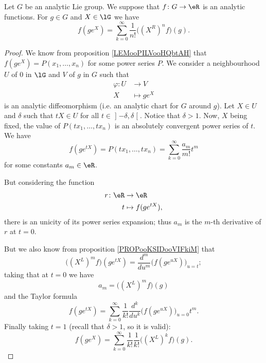 \begin{proposition}     \label{PROPooIYWQooZJtKiu}
	Let \( G\) be an analytic Lie group. We suppose that \( f\colon G\to \eR\) is an analytic functions. For \( g\in G\) and \( X\in \lG\) we have
	\begin{equation}
		f(g e^{X})=\sum_{k=0}^{\infty}\frac{1}{ n! }\big( (X^R)^nf \big)(g).
	\end{equation}
\end{proposition}

\begin{proof}
	We know from proposition \ref{LEMooPILVooHQbtAH} that \( f(g e^{X})=P(x_1,\ldots, x_n)\) for some power series \( P\). We consider a neighbourhood \( U\) of \( 0\) in \( \lG\) and \( V\) of \( g\) in \( G\) such that
	\begin{equation}
		\begin{aligned}
			\varphi\colon U & \to V           \\
			X               & \mapsto  ge^{X}
		\end{aligned}
	\end{equation}
	is an analytic diffeomorphism (i.e. an analytic chart for \( G\) around \( g\)). Let \( X\in U\) and \( \delta\) such that \( tX\in U\) for all \( t\in \mathopen] -\delta , \delta \mathclose[\). Notice that \( \delta>1\). Now, \( X\) being fixed, the value of \( P(tx_1,\ldots, tx_n)\) is an absolutely convergent power series of \( t\). We have
	\begin{equation}
		f(g e^{tX})=P(tx_1,\ldots, tx_n)=\sum_{k=0}^{\infty}\frac{ a_m }{ m! }t^m
	\end{equation}
	for some constants \( a_m\in \eR\).

	But considering the function
	\begin{equation}
		\begin{aligned}
			r\colon \eR & \to \eR              \\
			t           & \mapsto f(g e^{tX}),
		\end{aligned}
	\end{equation}
	there is an unicity of its power series expansion; thus \( a_m\) is the \( m\)-th derivative of \( r\) at \( t=0\).

	But we also know from proposition \ref{PROPooKSIDooVIFkiM} that
	\begin{equation}
		\big( (X^L)^mf \big)(g e^{tX})=\frac{ d^m }{ du^m }\big( f(g e^{uX}) \big)_{u=t};
	\end{equation}
	taking that at \( t=0\) we have
	\begin{equation}
		a_m=\big( (X^L)^mf \big)(g)
	\end{equation}
	and the Taylor formula
	\begin{equation}
		f(g e^{tX})=\sum_{k=0}^{\infty}\frac{1}{ k! }\frac{ d^k }{ du^k }\big( f(g e^{uX}) \big)_{u=0}t^m.
	\end{equation}
	Finally taking \( t=1\) (recall that \( \delta>1\), so it is valid):
	\begin{equation}
		f(g e^{X})=\sum_{k=0}^{\infty}\frac{1}{ k! }\frac{1}{ k! }\big( (X^L)^kf \big)(g).
	\end{equation}
\end{proof}

